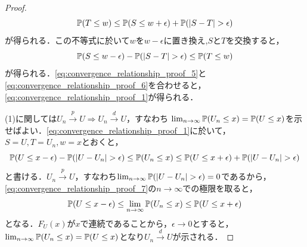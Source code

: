 \documentclass[main.tex]{subfiles}
\begin{document}
\begin{proof}
\begin{equation}
  \mathbb{P}(T \leq w) \leq \mathbb{P}(S \leq w + \epsilon) + \mathbb{P}(|S - T| > \epsilon)
  \label{eq:convergence_relationship_proof_5}
\end{equation}
が得られる．この不等式に於いて$w$を$w - \epsilon$に置き換え,$S$と$T$を交換すると，
\begin{equation}
  \mathbb{P}(S \leq w - \epsilon) - \mathbb{P}(|S - T| > \epsilon) \leq \mathbb{P}(T \leq w)
  \label{eq:convergence_relationship_proof_6}
\end{equation}
が得られる．\eqref{eq:convergence_relationship_proof_5}と\eqref{eq:convergence_relationship_proof_6}を合わせると，\eqref{eq:convergence_relationship_proof_1}が得られる．

(1)に関しては$U_n \xrightarrow{p} U \Rightarrow U_n \xrightarrow{d} U$，すなわち $\lim_{n \to \infty} \mathbb{P}(U_n \leq x) = \mathbb{P}(U \leq x)$を示せばよい．\eqref{eq:convergence_relationship_proof_1}に於いて，$S = U, T = U_n, w = x$とおくと，
\begin{equation}
  \mathbb{P}(U \leq x - \epsilon) - \mathbb{P}(|U - U_n| > \epsilon) \leq \mathbb{P}(U_n \leq x) \leq \mathbb{P}(U \leq x + \epsilon) + \mathbb{P}(|U - U_n| > \epsilon)
  \label{eq:convergence_relationship_proof_7}
\end{equation}
と書ける．$U_n \xrightarrow{p} U$，すなわち$\lim_{n \to \infty} \mathbb{P}(|U - U_n| > \epsilon) = 0$であるから，\eqref{eq:convergence_relationship_proof_7}の$n \to \infty$での極限を取ると，
\begin{equation}
  \mathbb{P}(U \leq x - \epsilon) \leq \lim_{n \to \infty} \mathbb{P}(U_n \leq x) \leq \mathbb{P}(U \leq x + \epsilon)
  \label{eq:convergence_relationship_proof_8}
\end{equation}
となる．$F_U(x)$が$x$で連続であることから，$\epsilon \to 0$とすると，$\lim_{n \to \infty} \mathbb{P}(U_n \leq x) = \mathbb{P}(U \leq x)$となり$U_n \xrightarrow{d} U$が示される．


\end{proof}
\end{document}
